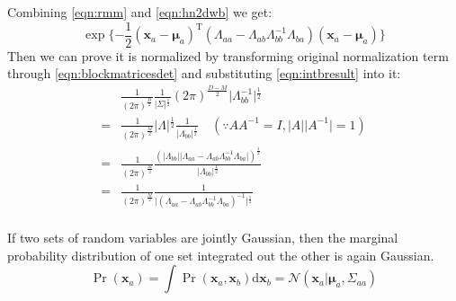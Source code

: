 Combining \eqref{eqn:rmm} and \eqref{eqn:hn2dwb} we get:
\begin{equation}
\exp{}\{-\frac{1}{2}(\mathbf{x}_{a}-\boldsymbol{\mu}_{a})^{\mathrm{T}}(\Lambda_{aa}-\Lambda_{ab}\Lambda_{bb}^{-1}\Lambda_{ba})(\mathbf{x}_{a}-\boldsymbol{\mu}_{a})\}
\label{eqn:margmd}
\end{equation}
Then we can prove it is normalized by transforming original
normalization term through \eqref{eqn:blockmatricesdet} and substituting
\eqref{eqn:intbresult} into it:
\begin{equation}
\begin{split}
&\frac{1}{(2\pi)^{\frac{D}{2}}}\frac{1}{\vert{}\Sigma\vert{}^{\frac{1}{2}}}(2\pi)^{\frac{D-M}{2}}\vert{}\Lambda_{bb}^{-1}\vert{}^{\frac{1}{2}}\\
=&\frac{1}{(2\pi)^{\frac{M}{2}}}\vert{}\Lambda\vert{}^{\frac{1}{2}}\frac{1}{\vert{}\Lambda_{bb}\vert{}^{\frac{1}{2}}}\quad{}(\because{}AA^{-1}=I,\vert{}A\vert{}\vert{}A^{-1}\vert{}=1)\\
=&\frac{1}{(2\pi)^{\frac{M}{2}}}\frac{(\vert{}\Lambda_{bb}\vert{}\vert{}\Lambda_{aa}-\Lambda_{ab}\Lambda_{bb}^{-1}\Lambda_{ba}\vert{})^{\frac{1}{2}}}{\vert{}\Lambda_{bb}\vert{}^{\frac{1}{2}}}\\
=&\frac{1}{(2\pi)^{\frac{M}{2}}}\frac{1}{\vert{}(\Lambda_{aa}-\Lambda_{ab}\Lambda_{bb}^{-1}\Lambda_{ba})^{-1}\vert{}^{\frac{1}{2}}}\\
\end{split}
\end{equation}
\begin{conclusion}
If two sets of random variables are jointly Gaussian, then the
marginal probability distribution of one set integrated out the other
is again Gaussian.
\begin{equation}
\Pr(\mathbf{x}_a)=\int{}\Pr(\mathbf{x}_{a},\mathbf{x}_{b})\text{d}\mathbf{x}_{b}=\mathcal{N}(\mathbf{x}_{a}\vert{}\boldsymbol{\mu}_{a},\Sigma_{aa})
\end{equation}
\end{conclusion}
